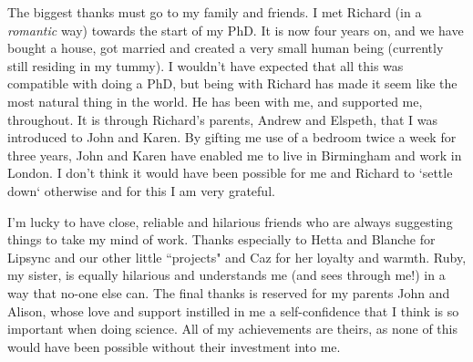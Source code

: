 The biggest thanks must go to my family and friends. I met Richard (in a \textit{romantic} way) towards the start of my PhD. It is now four years on, and we have bought a house, got married and created a very small human being (currently still residing in my tummy). I wouldn't have expected that all this was compatible with doing a PhD, but being with Richard has made it seem like the most natural thing in the world. He has been with me, and supported me, throughout. It is through Richard's parents, Andrew and Elspeth, that I was introduced to John and Karen. By gifting me use of a bedroom twice a week for three years, John and Karen have enabled me to live in Birmingham and work in London. I don't think it would have been possible for me and Richard to `settle down` otherwise and for this I am very grateful.

I'm lucky to have close, reliable and hilarious friends who are always suggesting things to take my mind of work. Thanks especially to Hetta and Blanche for Lipsync and our other little ``projects" and Caz for her loyalty and warmth. Ruby, my sister, is equally hilarious and understands me (and sees through me!) in a way that no-one else can. The final thanks is reserved for my parents John and Alison, whose love and support instilled in me a self-confidence that I think is so important when doing science. All of my achievements are theirs, as none of this would have been possible without their investment into me.